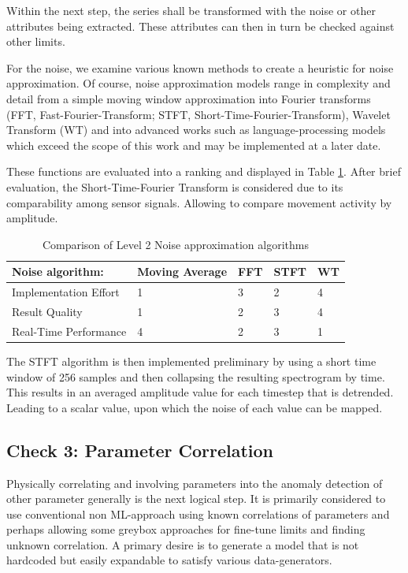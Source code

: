 Within the next step, the series shall be transformed with the noise or other attributes being extracted. These attributes can then in turn be checked against other limits.

For the noise, we examine various known methods to create a heuristic for noise approximation. Of course, noise approximation models range in complexity and detail from a simple moving window approximation into Fourier transforms (FFT, Fast-Fourier-Transform; STFT, Short-Time-Fourier-Transform), Wavelet Transform (WT) and into advanced works such as language-processing models \cite{hendriks_noise_2008} which exceed the scope of this work and may be implemented at a later date.

These functions are evaluated into a ranking and displayed in Table \ref{tab:lvl2_comparison}. After brief evaluation, the Short-Time-Fourier Transform is considered due to its comparability among sensor signals. Allowing to compare movement activity by amplitude.

\begin{table}[]
    \centering
    \begin{tabular}{@{}lllll@{}}
        \toprule
        Noise algorithm:      & Moving Average & FFT & STFT & WT \\ \midrule
        Implementation Effort & 1              & 3   & 2    & 4  \\
        Result Quality        & 1              & 2   & 3    & 4  \\
        Real-Time Performance & 4              & 2   & 3    & 1  \\ \bottomrule
    \end{tabular}
    \caption{Comparison of Level 2 Noise approximation algorithms}
    \label{tab:lvl2_comparison}
\end{table}

The STFT algorithm is then implemented preliminary by using a short time window of 256 samples and then collapsing the resulting spectrogram by time. This results in an averaged amplitude value for each timestep that is detrended. Leading to a scalar value, upon which the noise of each value can be mapped.

\subsection{Check 3: Parameter Correlation}
Physically correlating and involving parameters into the anomaly detection of other parameter generally is the next logical step. It is primarily considered to use conventional non ML-approach using known correlations of parameters and perhaps allowing some greybox approaches for fine-tune limits and finding unknown correlation. A primary desire is to generate a model that is not hardcoded but easily expandable to satisfy various data-generators.


